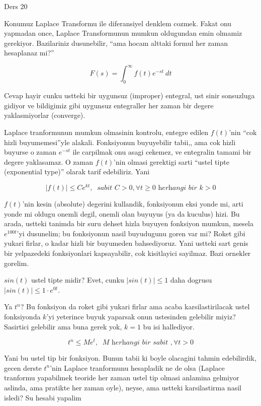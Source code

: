 \documentclass[12pt,fleqn]{article}\usepackage{../common}
\begin{document}
Ders 20

Konumuz Laplace Transformu ile diferansiyel denklem cozmek. Fakat onu
yapmadan once, Laplace Transformunun mumkun oldugundan emin olmamiz
gerekiyor. Bazilariniz dusunebilir, ``ama hocam alttaki formul her zaman
hesaplanaz mi?''

\[ F(s) = \int_0^{\infty} f(t)e^{-st} \ dt \]

Cevap hayir cunku ustteki bir uygunsuz (improper) entegral, ust sinir
sonsuzluga gidiyor ve bildigimiz gibi uygunsuz entegraller her zaman bir
degere yaklasmiyorlar (converge). 

Laplace tranformunun mumkun olmasinin kontrolu, entegre edilen $f(t)$'nin
``cok hizli buyumemesi''yle alakali. Fonksiyonun buyuyebilir tabii,, ama
cok hizli buyurse o zaman $e^{-st}$ ile carpilmak onu asagi cekemez, ve
entegralin tamami bir degere yaklasamaz. O zaman $f(t)$'nin olmasi
gerektigi sarti ``ustel tipte (exponential type)'' olarak tarif
edebiliriz. Yani 

\[ |f(t)| \le C e^{kt}, \ \textit{ sabit } C > 0, \forall t \ge 0 
\textit{ herhangi bir } k > 0
\]

$f(t)$'nin kesin (absolute) degerini kullandik, fonksiyonun eksi yonde mi,
arti yonde mi oldugu onemli degil, onemli olan buyuyus (ya da kuculus)
hizi. Bu arada, ustteki tanimda bir suru dehset hizla buyuyen fonksiyon
mumkun, mesela $e^{100t}$'yi dusunelim; bu fonksiyonun nasil buyudugunu
goren var mi? Roket gibi yukari firlar, o kadar hizli bir buyumeden
bahsediyoruz. Yani ustteki sart genis bir yelpazedeki fonksiyonlari
kapsayabilir, cok kisitlayici sayilmaz. Bazi ornekler gorelim.

$sin(t)$ ustel tipte midir? Evet, cunku $|sin(t)| \le 1$ daha dogrusu
$|sin(t)| \le 1 \cdot e^{0t}$. 

Ya $t^n$? Bu fonksiyon da roket gibi yukari firlar ama acaba
karsilastirilacak ustel fonksiyonda $k$'yi yeterince buyuk yaparsak onun
ustesinden gelebilir miyiz? Sasirtici gelebilir ama buna gerek yok, $k=1$
bu isi hallediyor. 

\[ t^n \le M e^t, \ \textit{ M herhangi bir sabit }, \forall t > 0 \]

Yani bu ustel tip bir fonksiyon. Bunun tabii ki boyle olacagini tahmin
edebilirdik, gecen derste $t^n$'nin Laplace tranformunu hesapladik ne de
olsa (Laplace tranformu yapabilmek teoride her zaman ustel tip olmasi
anlamina gelmiyor aslinda, ama pratikte her zaman oyle), neyse, ama ustteki
karsilastirma nasil isledi? Su hesabi yapalim
\end{document}
